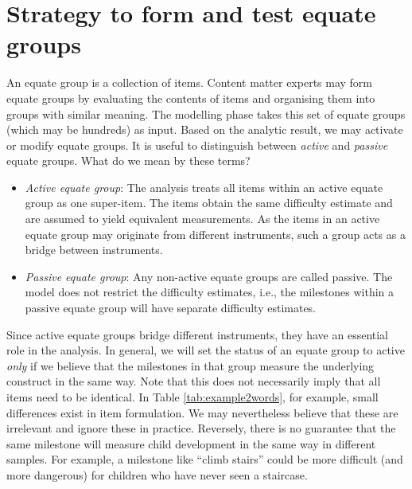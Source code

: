\documentclass[
]{book}
\providecommand{\tightlist}{%
  \setlength{\itemsep}{0pt}\setlength{\parskip}{0pt}}
\begin{document}
\hypertarget{sec:equaterules}{%
\section{Strategy to form and test equate groups}\label{sec:equaterules}}

An equate group is a collection of items. Content matter experts may form equate groups by evaluating the contents of items and organising them into groups with similar meaning. The modelling phase takes this set of equate groups (which may be hundreds) as input. Based on the analytic result, we may activate or modify equate groups. It is useful to distinguish between \emph{active} and \emph{passive} equate groups. What do we mean by these terms?

\begin{itemize}
\tightlist
\item
  \emph{Active equate group}: The analysis treats all items within an active equate group as one super-item. The items obtain the same difficulty estimate and are assumed to yield equivalent measurements. As the items in an active equate group may originate from different instruments, such a group acts as a bridge between instruments.
\item
  \emph{Passive equate group}: Any non-active equate groups are called passive. The model does not restrict the difficulty estimates, i.e., the milestones within a passive equate group will have separate difficulty estimates.
\end{itemize}

Since active equate groups bridge different instruments, they have an essential role in the analysis. In general, we will set the status of an equate group to active \emph{only} if we believe that the milestones in that group measure the underlying construct in the same way. Note that this does not necessarily imply that all items need to be identical. In Table \ref{tab:example2words}, for example, small differences exist in item formulation. We may nevertheless believe that these are irrelevant and ignore these in practice. Reversely, there is no guarantee that the same milestone will measure child development in the same way in different samples. For example, a milestone like ``climb stairs'' could be more difficult (and more dangerous) for children who have never seen a staircase.
\end{document}
